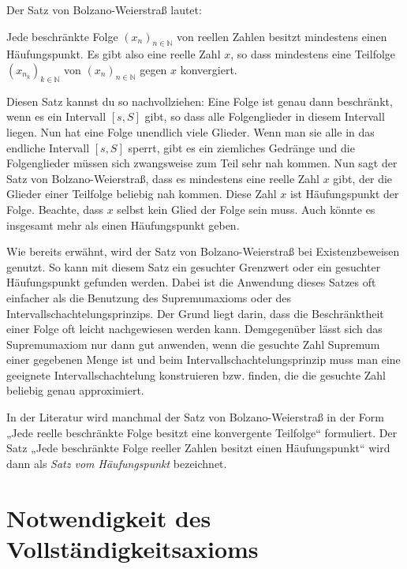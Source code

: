 \documentclass[fontsize=9pt,
               parskip=half-,
               DIV=14,
               listof=chapterentry,
               tocflat]{scrbook}
\begin{document}
Der Satz von Bolzano-Weierstraß lautet:

\begin{theorem*}
Jede beschränkte Folge $(x_{n})_{n\in \mathbb {N} }$ von reellen Zahlen besitzt mindestens einen Häufungspunkt. Es gibt also eine reelle Zahl $x$, so dass mindestens eine Teilfolge $\left(x_{n_{k}}\right)_{k\in \mathbb {N} }$ von $(x_{n})_{n\in \mathbb {N} }$ gegen $x$ konvergiert.

\end{theorem*}

Diesen Satz kannst du so nachvollziehen: Eine Folge ist genau dann beschränkt, wenn es ein Intervall $[s,S]$ gibt, so dass alle Folgenglieder in diesem Intervall liegen. Nun hat eine Folge unendlich viele Glieder. Wenn man sie alle in das endliche Intervall $[s,S]$ sperrt, gibt es ein ziemliches Gedränge und die Folgenglieder müssen sich zwangsweise zum Teil sehr nah kommen. Nun sagt der Satz von Bolzano-Weierstraß, dass es mindestens eine reelle Zahl $x$ gibt, der die Glieder einer Teilfolge beliebig nah kommen. Diese Zahl $x$ ist Häufungspunkt der Folge. Beachte, dass $x$ selbst kein Glied der Folge sein muss. Auch könnte es insgesamt mehr als einen Häufungspunkt geben.

Wie bereits erwähnt, wird der Satz von Bolzano-Weierstraß bei Existenzbeweisen genutzt. So kann mit diesem Satz ein gesuchter Grenzwert oder ein gesuchter Häufungspunkt gefunden werden. Dabei ist die Anwendung dieses Satzes oft einfacher als die Benutzung des Supremumaxioms oder des Intervallschachtelungsprinzips. Der Grund liegt darin, dass die Beschränktheit einer Folge oft leicht nachgewiesen werden kann. Demgegenüber lässt sich das Supremumaxiom nur dann gut anwenden, wenn die gesuchte Zahl Supremum einer gegebenen Menge ist und beim Intervallschachtelungsprinzip muss man eine geeignete Intervallschachtelung konstruieren bzw. finden, die die gesuchte Zahl beliebig genau approximiert.

\begin{hint*}
In der Literatur wird manchmal der Satz von Bolzano-Weierstraß in der Form „Jede reelle beschränkte Folge besitzt eine konvergente Teilfolge“ formuliert. Der Satz „Jede beschränkte Folge reeller Zahlen besitzt einen Häufungspunkt“ wird dann als \emph{Satz vom Häufungspunkt} bezeichnet.

\end{hint*}

\section{Notwendigkeit des Vollständigkeitsaxioms}
\end{document}
